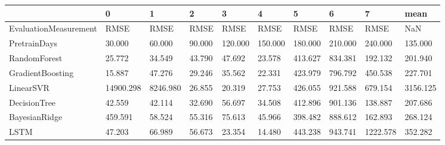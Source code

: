 \begin{tabular}{llllllllll}
\toprule
{} &         0 &        1 &      2 &       3 &       4 &       5 &       6 &        7 &     mean \\
\midrule
EvaluationMeasurement &      RMSE &     RMSE &   RMSE &    RMSE &    RMSE &    RMSE &    RMSE &     RMSE &      NaN \\
PretrainDays          &    30.000 &   60.000 & 90.000 & 120.000 & 150.000 & 180.000 & 210.000 &  240.000 &  135.000 \\
RandomForest          &    25.772 &   34.549 & 43.790 &  47.692 &  23.578 & 413.627 & 834.381 &  192.132 &  201.940 \\
GradientBoosting      &    15.887 &   47.276 & 29.246 &  35.562 &  22.331 & 423.979 & 796.792 &  450.538 &  227.701 \\
LinearSVR             & 14900.298 & 8246.980 & 26.855 &  20.319 &  27.753 & 426.055 & 921.588 &  679.154 & 3156.125 \\
DecisionTree          &    42.559 &   42.114 & 32.690 &  56.697 &  34.508 & 412.896 & 901.136 &  138.887 &  207.686 \\
BayesianRidge         &   459.591 &   58.524 & 55.316 &  75.613 &  45.966 & 398.482 & 888.612 &  162.893 &  268.124 \\
LSTM                  &    47.203 &   66.989 & 56.673 &  23.354 &  14.480 & 443.238 & 943.741 & 1222.578 &  352.282 \\
\bottomrule
\end{tabular}

